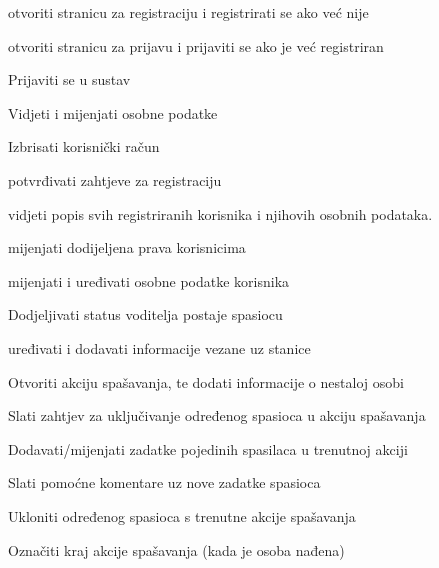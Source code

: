 			
			\begin{packed_enum}
				
				\item  {}
				
				\begin{packed_enum}
					\item otvoriti stranicu za registraciju i registrirati se ako već nije
					\item otvoriti stranicu za prijavu i prijaviti se ako je već registriran
				\end{packed_enum}
			
				\item  {}
		
				\begin{packed_enum}
				
					\item Prijaviti se u sustav
					\item Vidjeti i mijenjati osobne podatke
					\item Izbrisati korisnički račun
				
				\end{packed_enum}
				
				\item  {}
				
				\begin{packed_enum}
					\item potvrđivati zahtjeve za registraciju
					\item vidjeti popis svih registriranih korisnika i njihovih osobnih podataka.
					\item mijenjati dodijeljena prava korisnicima
					\item mijenjati i uređivati osobne podatke korisnika
					\item Dodjeljivati status voditelja postaje spasiocu
					\item uređivati i dodavati informacije vezane uz stanice
				\end{packed_enum}
				
				\item  {}
				
				\begin{packed_enum}
					
					\item Otvoriti akciju spašavanja, te dodati informacije o nestaloj osobi
					\item Slati zahtjev za uključivanje određenog spasioca u akciju spašavanja
					\item Dodavati/mijenjati zadatke pojedinih spasilaca u trenutnoj akciji
					\item Slati pomoćne komentare uz nove zadatke spasioca
					\item Ukloniti određenog spasioca s trenutne akcije spašavanja
					\item Označiti kraj akcije spašavanja (kada je osoba nađena)
					

\end{packed_enum}
\end{packed_enum}

